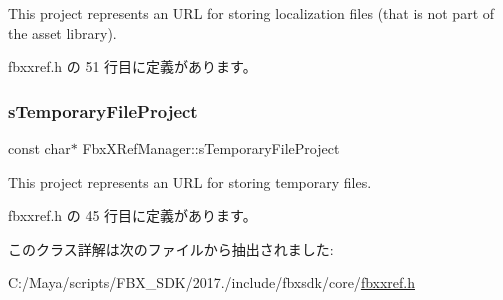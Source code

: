 This project represents an U\+RL for storing localization files (that is not part of the asset library). 



 fbxxref.\+h の 51 行目に定義があります。

\mbox{\label{class_fbx_x_ref_manager_ac1e95d1bc9cb30f5e9c75f08791e286f}} 
\subsubsection{\texorpdfstring{s\+Temporary\+File\+Project}{sTemporaryFileProject}}
{\footnotesize\ttfamily const char$\ast$ Fbx\+X\+Ref\+Manager\+::s\+Temporary\+File\+Project\hspace{0.3cm}{\ttfamily [static]}}



This project represents an U\+RL for storing temporary files. 



 fbxxref.\+h の 45 行目に定義があります。



このクラス詳解は次のファイルから抽出されました\+:\begin{DoxyCompactItemize}
\item 
C\+:/\+Maya/scripts/\+F\+B\+X\+\_\+\+S\+D\+K/2017./include/fbxsdk/core/\hyperlink{fbxxref_8h}{fbxxref.\+h}\end{DoxyCompactItemize}
